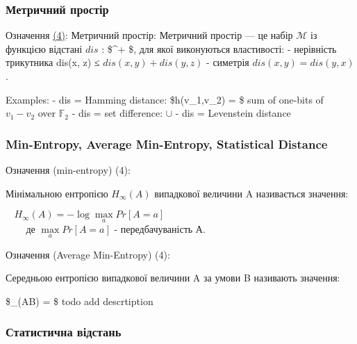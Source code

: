\documentclass[11pt]{article}
\begin{document}
    \hypertarget{ux43cux435ux442ux440ux438ux447ux43dux438ux439-ux43fux440ux43eux441ux442ux456ux440}{%
\subsubsection{Метричний
простір}\label{ux43cux435ux442ux440ux438ux447ux43dux438ux439-ux43fux440ux43eux441ux442ux456ux440}}

Означення \hyperref[література]{(4)}: Метричний простір: Метричний
простір --- це набір \(\mathcal{M}\) із функцією відстані
\(\textit{dis}\) :
\$\times{}\longrightarrow {}\^{}+ \$, для
якої виконуються властивості: - нерівність трикутника dis(x, z) ≤
\(\textit{dis}(x, y) + \textit{dis}(y, z)\) - симетрія
\(\textit{dis}(x, y) = \textit{dis}(y, x)\).

Examples: - dis = Hamming distance: \$h(v\_1,v\_2) = \$ sum of one-bits
of \(v_1-v_2\) over \(\mathbb{F}_2\) - dis = set difference: \(\cup\) -
dis = Levenstein distance

    \hypertarget{min-entropy-average-min-entropy-statistical-distance}{%
\subsubsection{Min-Entropy, Average Min-Entropy, Statistical
Distance}\label{min-entropy-average-min-entropy-statistical-distance}}

Означення (min-entropy) (4):

Мінімальною ентропією \(H_\infty(A)\) випадкової величини A називається
значення:

\(~~~~H_\infty(A) = -\log{\underset{a}{\max}}{Pr[A = a]}\)\\
\(~~~~~~~~\) де \(\underset{a}{\max}{Pr[A = a]}\) - передбачуваність А.

Означення (Average Min-Entropy) (4):

Середньою ентропією випадкової величини A за умови B називають значення:

\$\_\infty(A\textbar B) = \$ todo add descrtiption

    \hypertarget{ux441ux442ux430ux442ux438ux441ux442ux438ux447ux43dux430-ux432ux456ux434ux441ux442ux430ux43dux44c}{%
\subsubsection{Статистична
відстань}\label{ux441ux442ux430ux442ux438ux441ux442ux438ux447ux43dux430-ux432ux456ux434ux441ux442ux430ux43dux44c}}
\end{document}
